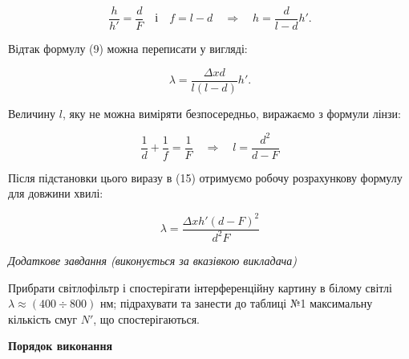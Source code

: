 \documentclass[12pt,a4paper]{article}
\begin{document}
    \begin{equation}
        \frac{h}{h'} = \frac{d}{F} \quad \text{і} \quad f = l - d \quad \Rightarrow \quad h = \frac{d}{l-d}h'.
        \tag{14}
    \end{equation}

    Відтак формулу (9) можна переписати у вигляді:

    \begin{equation}
        \lambda = \frac{\Delta xd}{l(l-d)}h'.
        \tag{15}
    \end{equation}

    Величину $l$, яку не можна виміряти безпосередньо, виражаємо з формули лінзи:

    \begin{equation}
        \frac{1}{d} + \frac{1}{f} = \frac{1}{F} \quad \Rightarrow \quad l = \frac{d^2}{d - F}
        \tag{16}
    \end{equation}

    Після підстановки цього виразу в (15) отримуємо робочу розрахункову формулу для довжини хвилі:

    \begin{equation}
        \lambda = \frac{\Delta xh' \left( d - F \right)^2}{d^2 F}
        \tag{17}
    \end{equation}

    \begin{center} \textit{Додаткове завдання (виконується за вказівкою викладача)} \end{center}

    Прибрати світлофільтр і спостерігати інтерференційну картину в білому
    світлі $\lambda \approx (400 \div 800)$ нм;
    підрахувати та занести до таблиці №1 максимальну кількість смуг $N'$, що спостерігаються.

    \newpage

    \begin{center} \textbf{Порядок виконання} \end{center}
\end{document}
